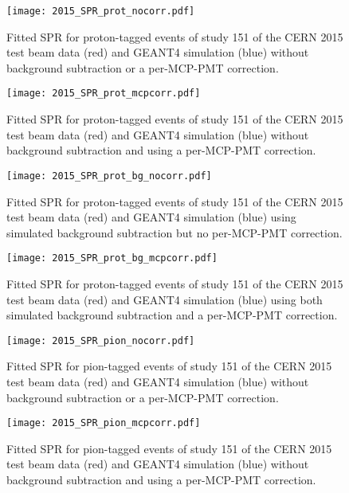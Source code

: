 \begin{figure}[!htb]
	\centering
	\texttt{[image: 2015\_SPR\_prot\_nocorr.pdf]}
	\caption{Fitted SPR for proton-tagged events of study 151 of the CERN 2015 test beam data (red) and GEANT4 simulation (blue) without background subtraction or a per-MCP-PMT correction.}
	\label{fig:2015_SPR_prot_nocorr}
\end{figure}

\begin{figure}[!htb]
	\centering
	\texttt{[image: 2015\_SPR\_prot\_mcpcorr.pdf]}
	\caption{Fitted SPR for proton-tagged events of study 151 of the CERN 2015 test beam data (red) and GEANT4 simulation (blue) without background subtraction and using a per-MCP-PMT correction.}
	\label{fig:2015_SPR_prot_mcpcorr}
\end{figure}

\begin{figure}[!htb]
	\centering
	\texttt{[image: 2015\_SPR\_prot\_bg\_nocorr.pdf]}
	\caption{Fitted SPR for proton-tagged events of study 151 of the CERN 2015 test beam data (red) and GEANT4 simulation (blue) using simulated background subtraction but no per-MCP-PMT correction.}
	\label{fig:2015_SPR_prot_bg_nocorr}
\end{figure}

\begin{figure}[!htb]
	\centering
	\texttt{[image: 2015\_SPR\_prot\_bg\_mcpcorr.pdf]}
	\caption{Fitted SPR for proton-tagged events of study 151 of the CERN 2015 test beam data (red) and GEANT4 simulation (blue) using both simulated background subtraction and a per-MCP-PMT correction.}
	\label{fig:2015_SPR_prot_bg_mcpcorr}
\end{figure}

\begin{figure}[!htb]
	\centering
	\texttt{[image: 2015\_SPR\_pion\_nocorr.pdf]}
	\caption{Fitted SPR for pion-tagged events of study 151 of the CERN 2015 test beam data (red) and GEANT4 simulation (blue) without background subtraction or a per-MCP-PMT correction.}
	\label{fig:2015_SPR_pion_nocorr}
\end{figure}

\begin{figure}[!htb]
	\centering
	\texttt{[image: 2015\_SPR\_pion\_mcpcorr.pdf]}
	\caption{Fitted SPR for pion-tagged events of study 151 of the CERN 2015 test beam data (red) and GEANT4 simulation (blue) without background subtraction and using a per-MCP-PMT correction.}
	\label{fig:2015_SPR_pion_mcpcorr}
\end{figure}


